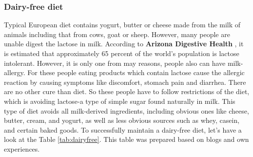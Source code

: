 \subsubsection{Dairy-free diet}
Typical European diet contains  yogurt, butter or cheese made from the milk of animals including that from cows, goat or sheep. However, many people are unable digest the lactose in milk. According to \textbf{Arizona Digestive Health} \cite{ArizonaDigestive2024Lactose}, it is estimated that approximately 65 percent of the world’s population is lactose intolerant. However, it is only one from may reasons, people also can have milk-allergy. For these people eating products which contain lactose cause the allergic reaction by causing symptoms like discomfort, stomach pain and  diarrhea. There are no other cure than diet. So these people have to follow restrictions of the diet, which is avoiding lactose-a type of simple sugar found naturally in milk.
This type of diet avoids all milk-derived ingredients, including obvious ones like cheese, butter, cream, and yogurt, as well as less obvious sources such as whey, casein, and certain baked goods.
To successfully maintain a dairy-free diet, let's have a look at the Table \ref{tab:dairyfree}. This table was prepared based on blogs \cite{BBCDairyFree}\cite{HealthLactoseFreeDiet} and own experiences.

